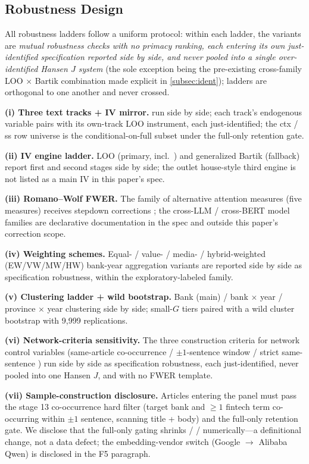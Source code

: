 \subsection{Robustness Design}\label{subsec:robust}
All robustness ladders follow a uniform protocol: within each ladder, the
variants are \emph{mutual robustness checks with no primacy ranking, each
entering its own just-identified specification reported side by side, and
never pooled into a single over-identified Hansen $J$ system} (the sole
exception being the pre-existing cross-family LOO $\times$ Bartik combination
made explicit in \ref{subsec:ident}); ladders are orthogonal to one another
and never crossed.

\textbf{(i) Three text tracks + IV mirror.}
 run side by side; each track's
endogenous variable pairs with its own-track LOO instrument, each
just-identified; the ctx / ss row universe is the conditional-on-full subset
under the full-only retention gate.

\textbf{(ii) IV engine ladder.} LOO (primary, incl.\ ) and
generalized Bartik (fallback) report first and second stages side by side; the
outlet house-style third engine is not listed as a main IV in this paper's
spec.

\textbf{(iii) Romano--Wolf FWER.} The family of alternative attention
measures (five measures) receives stepdown corrections
\parencite{romanowolf2005snooping}; the cross-LLM / cross-BERT model families
are declarative documentation in the spec and outside this paper's correction
scope.

\textbf{(iv) Weighting schemes.} Equal- / value- / media- / hybrid-weighted
(EW/VW/MW/HW) bank-year aggregation variants are reported side by side as
specification robustness, within the exploratory-labeled family.

\textbf{(v) Clustering ladder + wild bootstrap.} Bank (main) / bank $\times$
year / province $\times$ year clustering side by side; small-$G$ tiers paired
with a wild cluster bootstrap with 9{,}999 replications.

\textbf{(vi) Network-criteria sensitivity.} The three construction criteria
for network control variables (same-article co-occurrence / $\pm 1$-sentence
window  / strict same-sentence ) run side by side as
specification robustness, each just-identified, never pooled into one Hansen
$J$, and with no FWER template.

\textbf{(vii) Sample-construction disclosure.} Articles entering the panel
must pass the stage 13 co-occurrence hard filter (target bank and $\geq 1$
fintech term co-occurring within $\pm 1$ sentence, scanning title + body) and
the full-only retention gate. We disclose that the full-only gating shrinks
 /  / 
numerically---a definitional change, not a data defect; the embedding-vendor
switch (Google $\to$ Alibaba Qwen) is disclosed in the F5 paragraph.

